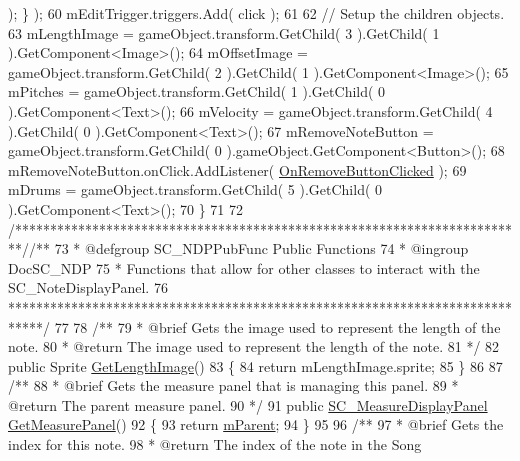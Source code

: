\begin{DoxyCodeInclude}
      ); \} );
60         mEditTrigger.triggers.Add( click );
61 
62         \textcolor{comment}{// Setup the children objects.}
63         mLengthImage = gameObject.transform.GetChild( 3 ).GetChild( 1 ).GetComponent<Image>();
64         mOffsetImage = gameObject.transform.GetChild( 2 ).GetChild( 1 ).GetComponent<Image>();
65         mPitches = gameObject.transform.GetChild( 1 ).GetChild( 0 ).GetComponent<Text>();
66         mVelocity = gameObject.transform.GetChild( 4 ).GetChild( 0 ).GetComponent<Text>();
67         mRemoveNoteButton = gameObject.transform.GetChild( 0 ).gameObject.GetComponent<Button>();
68         mRemoveNoteButton.onClick.AddListener( \hyperlink{group___s_c___n_d_p_handlers_ga0b545f6cd12ce56258842cb1036bceec}{OnRemoveButtonClicked} );
69         mDrums = gameObject.transform.GetChild( 5 ).GetChild( 0 ).GetComponent<Text>();
70     \}
71 
72     \textcolor{comment}{/*************************************************************************/}\textcolor{comment}{/** }
73 \textcolor{comment}{    * @defgroup SC\_NDPPubFunc Public Functions}
74 \textcolor{comment}{    * @ingroup DocSC\_NDP}
75 \textcolor{comment}{    * Functions that allow for other classes to interact with the SC\_NoteDisplayPanel.}
76 \textcolor{comment}{    *****************************************************************************/}
77 \textcolor{comment}{}
78 \textcolor{comment}{    /**}
79 \textcolor{comment}{     * @brief Gets the image used to represent the length of the note.}
80 \textcolor{comment}{     * @return The image used to represent the length of the note.}
81 \textcolor{comment}{    */}
82     \textcolor{keyword}{public} Sprite \hyperlink{group___s_c___n_d_p_unity_ga1038892636ae54a79c675287c4bb6fff}{GetLengthImage}()
83     \{
84         \textcolor{keywordflow}{return} mLengthImage.sprite;
85     \}
86 \textcolor{comment}{}
87 \textcolor{comment}{    /**}
88 \textcolor{comment}{     * @brief Gets the measure panel that is managing this panel.}
89 \textcolor{comment}{     * @return The parent measure panel.}
90 \textcolor{comment}{    */}
91     \textcolor{keyword}{public} \hyperlink{class_s_c___measure_display_panel}{SC\_MeasureDisplayPanel} \hyperlink{group___s_c___n_d_p_unity_ga404972fc48a89d678d0c6fa801573814}{GetMeasurePanel}()
92     \{
93         \textcolor{keywordflow}{return} \hyperlink{group___s_c___n_d_p_priv_var_ga360017747d9ed8910ddd4b3309477710}{mParent};
94     \}
95 \textcolor{comment}{}
96 \textcolor{comment}{    /**}
97 \textcolor{comment}{     * @brief Gets the index for this note.}
98 \textcolor{comment}{     * @return The index of the note in the Song}

\end{DoxyCodeInclude}

